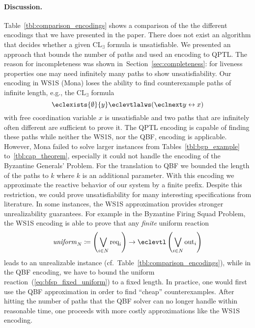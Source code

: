 \documentclass{LMCS}
\newcommand{\uniform}{\mathit{uniform}}
\theoremstyle{plain}\newtheorem{theorem}[thm]{Theorem}
\theoremstyle{plain}\newtheorem{lemma}[thm]{Lemma}
\theoremstyle{plain}\newtheorem{proposition}[thm]{Proposition}
\theoremstyle{plain}\newtheorem{corollary}[thm]{Corollary}
\theoremstyle{definition}\newtheorem{definition}{Definition}[section]
\begin{document}
\paragraph{\bf Discussion.}


Table~\ref{tbl:comparison_encodings} shows a comparison of the the different encodings that we have presented in the paper.
There does not exist an algorithm that decides whether a given CL$_\exists$ formula is unsatisfiable.
We presented an approach that bounds the number of paths and used an encoding to QPTL\@.
The reason for incompleteness was shown in~Section~\ref{sec:completeness}: for liveness properties one may need infinitely many paths to show unsatisfiability.
Our encoding in WS1S (Mona) loses the ability to find counterexample paths of infinite length, e.g., the CL$_\exists$ formula
\begin{equation} \label{eq:example_infinite_long}
  \eclexists{\emptyset}{y} \eclevtlalws (\eclnext y \leftrightarrow x)  
\end{equation}
with free coordination variable $x$ is unsatisfiable and two paths that are infinitely often different are sufficient to prove it.
The QPTL encoding is capable of finding these paths while neither the WS1S, nor the QBF, encoding is applicable.
However, Mona failed to solve larger instances from Tables~\ref{tbl:bgp_example} to~\ref{tbl:cap_theorem}, especially it could not handle the encoding of the Byzantine Generals' Problem.
For the translation to QBF we bounded the length of the paths to $k$ where $k$ is an additional parameter.
With this encoding we approximate the reactive behavior of our system by a finite prefix.
Despite this restriction, we could prove unsatisfiability for many interesting specifications from literature.
In some instances, the WS1S approximation provides stronger unrealizability guarantees.
For example in the Byzantine Firing Squad Problem, the WS1S encoding is able to prove that any \emph{finite} uniform reaction
\begin{equation} \label{eq:bfsp_finite_uniform}
  \uniform_N \coloneqq \left( \bigvee_{i \in N} \text{req}_i \right) \rightarrow \eclevtl \left( \bigvee_{i \in N} \text{out}_i \right)
\end{equation}
leads to an unrealizable instance (cf.\ Table~\ref{tbl:comparison_encodings}), while in the QBF encoding, we have to bound the uniform reaction~(\ref{eq:bfsp_fixed_uniform}) to a fixed length.
In practice, one would first use the QBF approximation in order to find ``cheap'' counterexamples.
After hitting the number of paths that the QBF solver can no longer handle within reasonable time, one proceeds with more costly approximations like the WS1S encoding.
\end{document}
